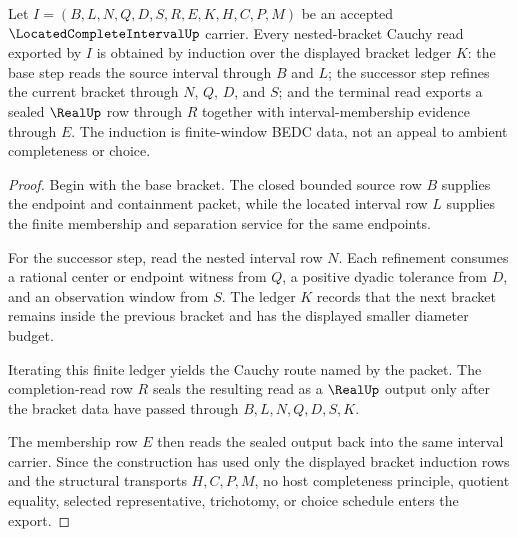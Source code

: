 \begin{theorem}
\label{thm:located-complete-interval-cauchy-bracket-induction}
Let $I=(B,L,N,Q,D,S,R,E,K,H,C,P,M)$ be an accepted $\LocatedCompleteIntervalUp$ carrier. Every nested-bracket Cauchy read exported by $I$ is obtained by induction over the displayed bracket ledger $K$: the base step reads the source interval through $B$ and $L$; the successor step refines the current bracket through $N$, $Q$, $D$, and $S$; and the terminal read exports a sealed $\RealUp$ row through $R$ together with interval-membership evidence through $E$. The induction is finite-window BEDC data, not an appeal to ambient completeness or choice.
\end{theorem}
\begin{proof}
Begin with the base bracket. The closed bounded source row $B$ supplies the endpoint and containment packet, while the located interval row $L$ supplies the finite membership and separation service for the same endpoints.

For the successor step, read the nested interval row $N$. Each refinement consumes a rational center or endpoint witness from $Q$, a positive dyadic tolerance from $D$, and an observation window from $S$. The ledger $K$ records that the next bracket remains inside the previous bracket and has the displayed smaller diameter budget.

Iterating this finite ledger yields the Cauchy route named by the packet. The completion-read row $R$ seals the resulting read as a $\RealUp$ output only after the bracket data have passed through $B,L,N,Q,D,S,K$.

The membership row $E$ then reads the sealed output back into the same interval carrier. Since the construction has used only the displayed bracket induction rows and the structural transports $H,C,P,M$, no host completeness principle, quotient equality, selected representative, trichotomy, or choice schedule enters the export.
\end{proof}


